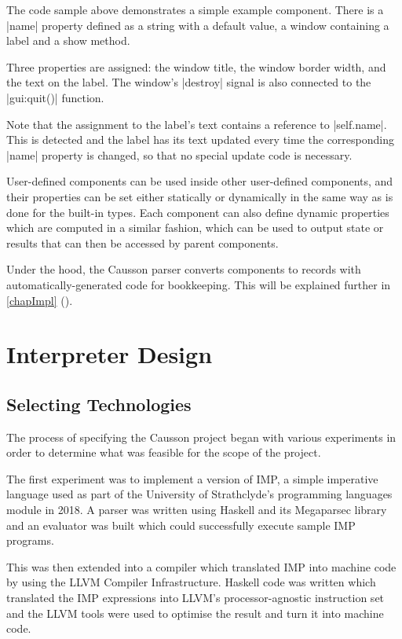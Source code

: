\documentclass[11pt]{report}
\begin{document}
The code sample above demonstrates a simple example component. There is a |name| property defined as a string with a default value, a window containing a label and a show method.

Three properties are assigned: the window title, the window border width, and the text on the label. The window's |destroy| signal is also connected to the |gui:quit()| function.

Note that the assignment to the label's text contains a reference to |self.name|. This is detected and the label has its text updated every time the corresponding |name| property is changed, so that no special update code is necessary.

User-defined components can be used inside other user-defined components, and their properties can be set either statically or dynamically in the same way as is done for the built-in types. Each component can also define dynamic properties which are computed in a similar fashion, which can be used to output state or results that can then be accessed by parent components.

Under the hood, the Causson parser converts components to records with automatically-generated code for bookkeeping. This will be explained further in \cref{chapImpl} (\emph{}).

\chapter{Interpreter Design} \label{chapDesign}

\section{Selecting Technologies}

The process of specifying the Causson project began with various experiments in order to determine what was feasible for the scope of the project.

The first experiment was to implement a version of IMP, a simple imperative language used as part of the University of Strathclyde's programming languages module in 2018. A parser was written using Haskell and its Megaparsec library and an evaluator was built which could successfully execute sample IMP programs.

This was then extended into a compiler which translated IMP into machine code by using the LLVM Compiler Infrastructure\cite{llvm}. Haskell code was written which translated the IMP expressions into LLVM's processor-agnostic instruction set and the LLVM tools were used to optimise the result and turn it into machine code.
\end{document}

